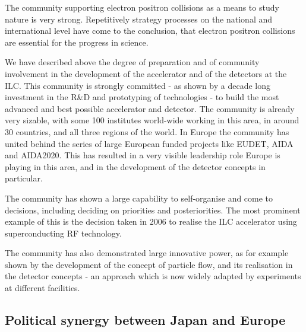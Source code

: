 \documentclass[%
 reprint,
 amsmath,amssymb,
 aps,
]{revtex4-1}
\begin{document}
The community supporting electron positron collisions as a means to study nature is very strong. Repetitively strategy processes on the national and international level have come to the conclusion, that electron positron collisions are essential for the progress in science. 

We have described above the degree of preparation and of community involvement in the development of the accelerator and of the detectors at the ILC. This community is strongly committed - as shown by a decade long investment in the R\&D and prototyping of technologies - to build the most advanced and best possible accelerator and detector. The community is already very sizable, with some 100 institutes world-wide working in this area, in around 30 countries, and all three regions of the world. In Europe the community has united behind the series of large European funded projects like EUDET, AIDA and AIDA2020. This has resulted in a very visible leadership role Europe is playing in this area, and in the development of the detector concepts in particular. 

The community has shown a large capability to self-organise and come to decisions, including deciding on priorities and posteriorities. The most prominent example of this is the decision taken in 2006 to realise the ILC accelerator using superconducting RF technology. 

The community has also demonstrated large innovative power, as for example shown by the development of the concept of particle flow, and its realisation in the detector concepts - an approach which is now widely adapted by experiments at different facilities. 

\subsection{\label{sec:discussionPol}Political synergy between Japan and Europe}
\end{document}
